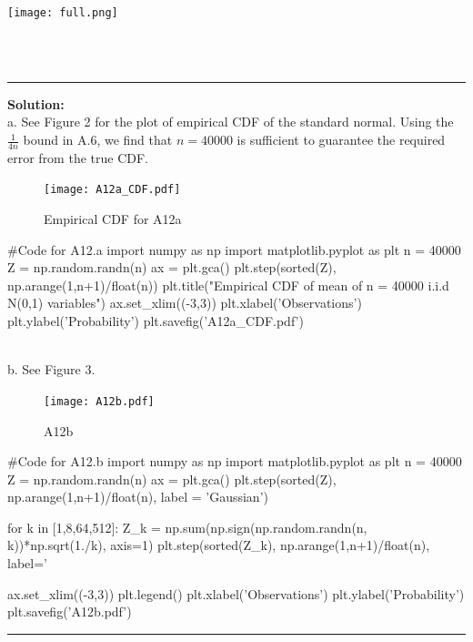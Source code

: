 \documentclass{article}
\newcommand{\1}{\mathbf{1}}
\begin{document}
\begin{center}
\texttt{[image: full.png]}
\end{center} 

\\
        \\
\noindent\rule{\textwidth}{1pt}
{\bf Solution:}\\
a. See Figure 2 for the plot of empirical CDF of the standard normal.
Using the $\frac{1}{4n}$ bound in A.6, we find that $n = 40000$ is sufficient to guarantee the required error from the true CDF.

\begin{figure}[h!]
\centering
\texttt{[image: A12a\_CDF.pdf]}
\caption{Empirical CDF for A12a}
\end{figure}


\begin{python}
#Code for A12.a
import numpy as np
import matplotlib.pyplot as plt
n = 40000
Z = np.random.randn(n)
ax = plt.gca()
plt.step(sorted(Z), np.arange(1,n+1)/float(n))
plt.title("Empirical CDF of mean of n = 40000 i.i.d N(0,1) variables")
ax.set_xlim((-3,3))
plt.xlabel('Observations')
plt.ylabel('Probability')
plt.savefig('A12a_CDF.pdf')
\end{python}

\\
b. See Figure 3.
\begin{figure}[h!]
\centering
\texttt{[image: A12b.pdf]}
\caption{A12b}
\end{figure}
\newpage
\begin{python}
#Code for A12.b
import numpy as np
import matplotlib.pyplot as plt
n = 40000
Z = np.random.randn(n)
ax = plt.gca()
plt.step(sorted(Z), np.arange(1,n+1)/float(n), label = 'Gaussian')

for k in [1,8,64,512]:
    Z_k = np.sum(np.sign(np.random.randn(n, k))*np.sqrt(1./k), axis=1) 
    plt.step(sorted(Z_k), np.arange(1,n+1)/float(n), label='%

ax.set_xlim((-3,3))
plt.legend()
plt.xlabel('Observations')
plt.ylabel('Probability')
plt.savefig('A12b.pdf')
\end{python}
\noindent\rule{\textwidth}{1pt}
            
\end{document}
